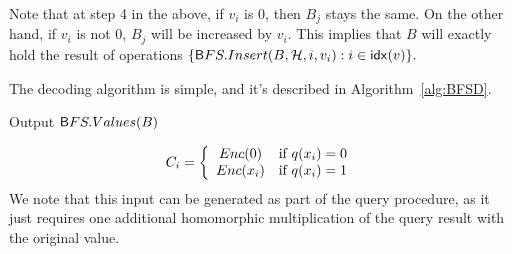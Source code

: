 Note that at step 4 in the above, if $v_i$ is 0, then $B_j$ stays the
same. On the other hand, if $v_i$ is not 0, $B_j$ will be increased by
$v_i$.  This implies that $B$ will exactly hold the result of 
operations $\{{\sf BFS.Insert}(B, \HHH, i, v_i): i \in \idx(v) \}.$

The decoding algorithm is simple, and it's described in
Algorithm~\ref{alg:BFSD}.
\begin{algorithm}[htbp]
\BEN
\item Output ${\sf BFS.Values}(B)$
\EEN
\caption{ ${\sf BFS\mbox{-}CODE}.\Decode(B)$} 
\label{alg:BFSD}
\end{algorithm}

\iffalse
\[C_i=\left\{\begin{array}{cl}Enc(0)&\hbox{if } q(x_i)=0\\Enc(x_i)&\hbox{if }q(x_i)=1\end{array}\right.\]
We note that this input can be generated as part of the query procedure, as it just requires one additional homomorphic multiplication of the query result with the original value.







